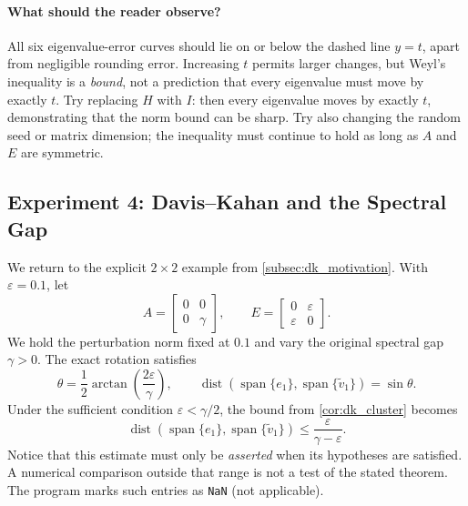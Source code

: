 \documentclass[14pt,letterpaper]{article}
\theoremstyle{plain}
\theoremstyle{definition}
\theoremstyle{remark}
\DeclareMathOperator{\Span}{span}
\DeclareMathOperator{\dist}{dist}
\begin{document}
\paragraph{What should the reader observe?}
All six eigenvalue-error curves should lie on or below
the dashed line $y=t$, apart from negligible rounding
error. Increasing $t$ permits larger changes, but
Weyl's inequality is a \emph{bound}, not a prediction
that every eigenvalue must move by exactly $t$.
Try replacing $H$ with $I$: then every eigenvalue
moves by exactly $t$, demonstrating that the norm
bound can be sharp. Try also changing the random seed
or matrix dimension; the inequality must continue
to hold as long as $A$ and $E$ are symmetric.

\subsection{Experiment 4: Davis--Kahan and the Spectral Gap}
\label{subsec:matlab_dk}

We return to the explicit $2\times2$ example from
\cref{subsec:dk_motivation}. With $\varepsilon=0.1$,
let
\[
A=\begin{bmatrix}0&0\\0&\gamma\end{bmatrix},
\qquad
E=\begin{bmatrix}0&\varepsilon\\\varepsilon&0\end{bmatrix}.
\]
We hold the perturbation norm fixed at $0.1$ and
vary the original spectral gap $\gamma>0$.
The exact rotation satisfies
\[
\theta=\frac12\arctan\left(\frac{2\varepsilon}{\gamma}\right),
\qquad
\dist(\Span\{e_1\},\Span\{\widetilde v_1\})=\sin\theta.
\]
Under the sufficient condition
$\varepsilon<\gamma/2$, the bound from
\cref{cor:dk_cluster} becomes
\[
\boxed{
\dist(\Span\{e_1\},\Span\{\widetilde v_1\})
\leq\frac{\varepsilon}{\gamma-\varepsilon}.
}
\]
Notice that this estimate must only be \emph{asserted}
when its hypotheses are satisfied. A numerical
comparison outside that range is not a test of the
stated theorem. The program marks such entries as
\texttt{NaN} (not applicable).
\end{document}
